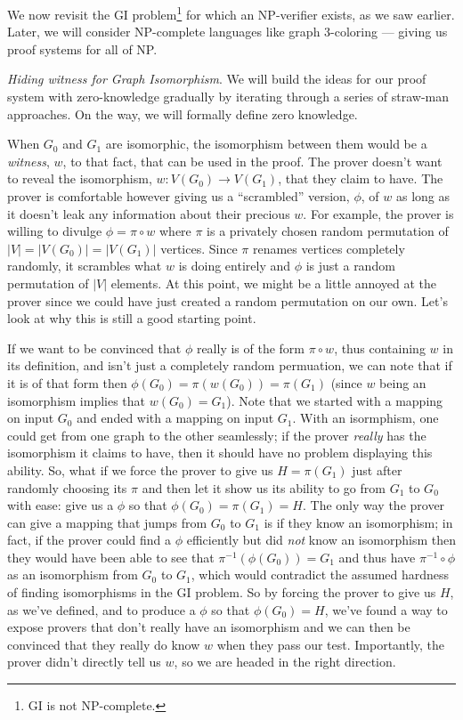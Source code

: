 \documentclass[12pt]{tufte-book}
\begin{document}
	We now revisit the GI problem\footnote{GI is not NP-complete.} for which an NP-verifier exists, as we saw earlier. Later, we will consider NP-complete languages like graph 3-coloring --- giving us proof systems for all of NP. \smallskip

	\noindent \textit{Hiding witness for Graph Isomorphism}. We will build the ideas for our proof system with zero-knowledge gradually by iterating through a series of straw-man approaches. On the way, we will formally define zero knowledge. 

	When $G_0$ and $G_1$ are isomorphic, the isomorphism between them would be a \textit{witness}, $w$, to that fact, that can be used in the proof.  The prover doesn't want to reveal the isomorphism, $w:V(G_0)\rightarrow V(G_1)$, that they claim to have.  The prover is comfortable however giving us a ``scrambled'' version, $\phi$, of $w$ as long as it doesn't leak any information about their precious $w$.  For example, the prover is willing to divulge $\phi = \pi \circ w$ where $\pi$ is a privately chosen random permutation of $|V|=|V(G_0)|=|V(G_1)|$ vertices.  Since $\pi$ renames vertices completely randomly, it scrambles what $w$ is doing entirely and $\phi$ is just a random permutation of $|V|$ elements.  At this point, we might be a little annoyed at the prover since we could have just created a random permutation on our own.  Let's look at why this is still a good starting point.

	If we want to be convinced that $\phi$ really is of the form $\pi \circ w$, thus containing $w$ in its definition, and isn't just a completely random permuation, we can note that if it is of that form then $\phi(G_0)=\pi(w(G_0))=\pi(G_1)$ (since $w$ being an isomorphism implies that $w(G_0)=G_1$).  Note that we started with a mapping on input $G_0$ and ended with a mapping on input $G_1$.  With an isormphism, one could get from one graph to the other seamlessly; if the prover \textit{really} has the isomorphism it claims to have, then it should have no problem displaying this ability.  So, what if we force the prover to give us $H=\pi (G_1)$ just after randomly choosing its $\pi$ and then let it show us its ability to go from $G_1$ to $G_0$ with ease: give us a $\phi$ so that $\phi(G_0)=\pi(G_1)=H$.  The only way the prover can give a mapping that jumps from $G_0$ to $G_1$ is if they know an isomorphism; in fact, if the prover could find a $\phi$ efficiently but did \textit{not} know an isomorphism then they would have been able to see that $\pi^{-1}(\phi(G_0))=G_1$ and thus have $\pi^{-1}\circ\phi$ as an isomorphism from $G_0$ to $G_1$, which would contradict the assumed hardness of finding isomorphisms in the GI problem. So by forcing the prover to give us $H$, as we've defined, and to produce a $\phi$ so that $\phi(G_0)=H$, we've found a way to expose provers that don't really have an isomorphism and we can then be convinced that they really do know $w$ when they pass our test.  Importantly, the prover didn't directly tell us $w$, so we are headed in the right direction.
\end{document}
